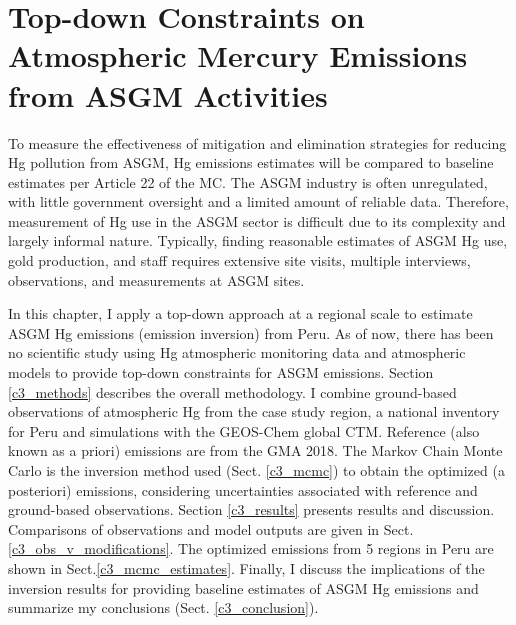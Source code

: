 \chapter{Top-down Constraints on Atmospheric Mercury Emissions from ASGM Activities}\label{Chapter3}
To measure the effectiveness of mitigation and elimination strategies for reducing Hg pollution from ASGM, Hg emissions estimates will be compared to baseline estimates per Article 22 of the MC. The ASGM industry is often unregulated, with little government oversight and a limited amount of reliable data\cite{oneill_estimating_2017}.  Therefore, measurement of Hg use in the ASGM sector is difficult due to its complexity and largely informal nature.  Typically, finding reasonable estimates of ASGM Hg use, gold production, and staff requires extensive site visits, multiple interviews, observations, and measurements at ASGM sites\cite{oneill_estimating_2017}.
\begin{flushleft}
In this chapter, I apply a top-down approach at a regional scale to estimate ASGM Hg emissions (emission inversion) from Peru. As of now, there has been no scientific study using Hg atmospheric monitoring data and atmospheric models to provide top-down constraints for ASGM emissions. Section \ref{c3_methods} describes the overall methodology. I combine ground-based observations of atmospheric Hg from the case study region\cite{koenig_seasonal_2021}, a national inventory for Peru\cite{artisanal_gold_council_reporte_2017} and simulations with the GEOS-Chem global CTM. Reference (also known as a priori) emissions are from the GMA 2018\cite{united_nations_environment_programme_technical_2019,steenhuisen_development_2019}. The Markov Chain Monte Carlo is the inversion method used (Sect. \ref{c3_mcmc}) to obtain the optimized (a posteriori) emissions, considering uncertainties associated with reference and ground-based observations. Section \ref{c3_results} presents results and discussion. Comparisons of observations and model outputs are given in Sect. \ref{c3_obs_v_modifications}. The optimized emissions from 5 regions in Peru are shown in Sect.\ref{c3_mcmc_estimates}. Finally, I discuss the implications of the inversion results for providing baseline estimates of ASGM Hg emissions and summarize my conclusions (Sect. \ref{c3_conclusion}).

\end{flushleft}
